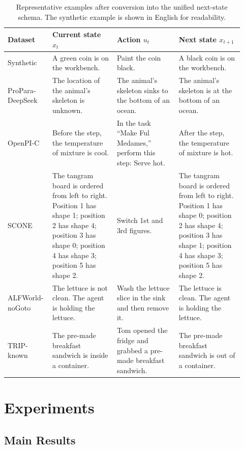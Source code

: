 \documentclass{article}
\begin{document}
\begin{table}[!htbp]
  \centering
  \caption{Representative examples after conversion into the unified next-state schema. The synthetic example is shown in English for readability.}
  \label{tab:dataset-examples}
  \scriptsize
  \setlength{\tabcolsep}{2pt}
  \renewcommand{\arraystretch}{1.08}
  \begin{tabular}{p{0.15\linewidth}p{0.26\linewidth}p{0.25\linewidth}p{0.26\linewidth}}
    \toprule
    Dataset & Current state $x_t$ & Action $u_t$ & Next state $x_{t+1}$ \\
    \midrule
    Synthetic & A green coin is on the workbench. & Paint the coin black. & A black coin is on the workbench. \\
    ProPara-DeepSeek & The location of the animal's skeleton is unknown. & The animal's skeleton sinks to the bottom of an ocean. & The animal's skeleton is at the bottom of an ocean. \\
    OpenPI-C & Before the step, the temperature of mixture is cool. & In the task ``Make Ful Medames,'' perform this step: Serve hot. & After the step, the temperature of mixture is hot. \\
    SCONE & The tangram board is ordered from left to right. Position 1 has shape 1; position 2 has shape 4; position 3 has shape 0; position 4 has shape 3; position 5 has shape 2. & Switch 1st and 3rd figures. & The tangram board is ordered from left to right. Position 1 has shape 0; position 2 has shape 4; position 3 has shape 1; position 4 has shape 3; position 5 has shape 2. \\
    ALFWorld-noGoto & The lettuce is not clean. The agent is holding the lettuce. & Wash the lettuce slice in the sink and then remove it. & The lettuce is clean. The agent is holding the lettuce. \\
    TRIP-known & The pre-made breakfast sandwich is inside a container. & Tom opened the fridge and grabbed a pre-made breakfast sandwich. & The pre-made breakfast sandwich is out of a container. \\
    \bottomrule
  \end{tabular}
\end{table}

\section{Experiments}

\subsection{Main Results}
\end{document}
